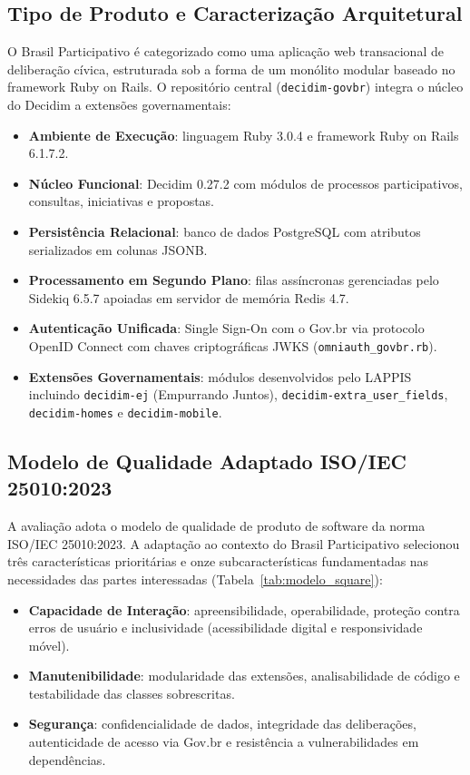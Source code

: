 \documentclass[journal]{IEEEtran}
\begin{document}
\subsection{Tipo de Produto e Caracterização Arquitetural}
\label{sec:arquitetura}

O Brasil Participativo é categorizado como uma aplicação web transacional de deliberação cívica, estruturada sob a forma de um monólito modular baseado no framework Ruby on Rails. O repositório central (\texttt{decidim-govbr}) integra o núcleo do Decidim a extensões governamentais:

\begin{itemize}
    \item \textbf{Ambiente de Execução}: linguagem Ruby 3.0.4 e framework Ruby on Rails 6.1.7.2.
    \item \textbf{Núcleo Funcional}: Decidim 0.27.2 com módulos de processos participativos, consultas, iniciativas e propostas.
    \item \textbf{Persistência Relacional}: banco de dados PostgreSQL com atributos serializados em colunas JSONB.
    \item \textbf{Processamento em Segundo Plano}: filas assíncronas gerenciadas pelo Sidekiq 6.5.7 apoiadas em servidor de memória Redis 4.7.
    \item \textbf{Autenticação Unificada}: Single Sign-On com o Gov.br via protocolo OpenID Connect com chaves criptográficas JWKS (\texttt{omniauth\_govbr.rb}).
    \item \textbf{Extensões Governamentais}: módulos desenvolvidos pelo LAPPIS incluindo \texttt{decidim-ej} (Empurrando Juntos), \texttt{decidim-extra\_user\_fields}, \texttt{decidim-homes} e \texttt{decidim-mobile}.
\end{itemize}

\subsection{Modelo de Qualidade Adaptado ISO/IEC 25010:2023}
\label{sec:modelo_square}

A avaliação adota o modelo de qualidade de produto de software da norma ISO/IEC 25010:2023. A adaptação ao contexto do Brasil Participativo selecionou três características prioritárias e onze subcaracterísticas fundamentadas nas necessidades das partes interessadas (Tabela~\ref{tab:modelo_square}):

\begin{itemize}
    \item \textbf{Capacidade de Interação}: apreensibilidade, operabilidade, proteção contra erros de usuário e inclusividade (acessibilidade digital e responsividade móvel).
    \item \textbf{Manutenibilidade}: modularidade das extensões, analisabilidade de código e testabilidade das classes sobrescritas.
    \item \textbf{Segurança}: confidencialidade de dados, integridade das deliberações, autenticidade de acesso via Gov.br e resistência a vulnerabilidades em dependências.
\end{itemize}
\end{document}
